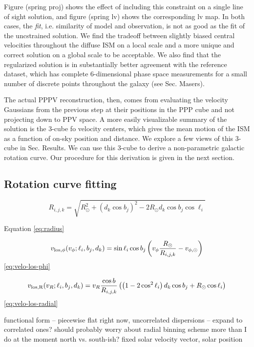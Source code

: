 Figure (spring proj) shows the effect of including this constraint on a single line of sight solution, and figure (spring lv) shows the corresponding lv map. In both cases, the \emph{fit}, i.e. similarity of model and observation, is not as good as the fit of the uncstrained solution. We find the tradeoff between slightly biased central velocities throughout the diffuse ISM on a local scale and a more unique and correct solution on a global scale to be acceptable. We also find that the regularized solution is in substantially better agreement with the reference dataset, which has complete 6-dimensional phase space measurements for a small number of discrete points throughout the galaxy (see Sec. Masers). 

The actual PPPV reconstruction, then, comes from evaluating the velocity Gaussians from the previous step at their positions in the PPP cube and not projecting down to PPV space. A more easily visualizable summary of the solution is the 3-cube fo velocity centers, which gives the mean motion of the ISM as a function of on-sky position and distance. We explore a few views of this 3-cube in Sec. Results. We can use this 3-cube to derive a non-parametric galactic rotation curve. Our procedure for this derivation is given in the next section. 

\subsection{Rotation curve fitting}
\begin{equation}
\label{eq:radius}
    R_{i,j,k} = \sqrt{ R_\odot^2 + (d_k \cos b_j)^2 - 2 R_\odot d_k \cos b_j \cos \ell_i}
\end{equation}

Equation \ref{eq:radius}

\begin{equation}
\label{eq:velo-los-phi}
    v_{\rm{los}, \phi}(v_\phi; \ell_i, b_j, d_k) = \sin \ell_i \cos b_j  \left( v_\phi \frac{R_\odot}{R_{i,j,k}} - v_{\phi, \odot} \right)
\end{equation}
\ref{eq:velo-los-phi}

\begin{equation}
\label{eq:velo-los-radial}
    v_{\rm{los}, R} (v_R; \ell_i,  b_j, d_k) = v_R \frac{\cos b}{R_{i,j,k}} \left( \left( 1 - 2 \cos^2 \ell_i \right) d_k \cos b_j + R_\odot \cos \ell_i \right)
\end{equation}
\ref{eq:velo-los-radial}

functional form -- piecewise flat 
right now, uncorrelated dispersions -- expand to correlated ones?
should probably worry about radial binning scheme more than I do at the moment
north vs. south-ish?
fixed solar velocity vector, solar position